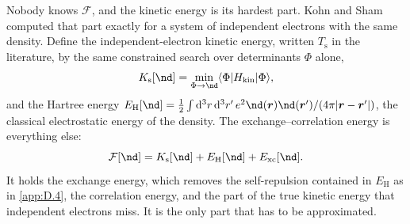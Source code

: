 Nobody knows $\mathcal{F}$, and the kinetic energy is its hardest part. Kohn and Sham computed that part exactly for a system of independent electrons with the same density. Define the independent-electron kinetic energy, written $T_{\mathrm{s}}$ in the literature, by the same constrained search over determinants $\Phi$ alone,
\begin{equation*}
  K_{\mathrm{s}}[\nd] = \min_{\Phi\to\nd}\langle\Phi|H_{\mathrm{kin}}|\Phi\rangle ,
\end{equation*}
and the Hartree energy $E_{\mathrm{H}}[\nd] = \tfrac12\int\dd^3r\,\dd^3r'\,e^2\nd(\vect{r})\nd(\vect{r}')/(4\pi|\vect{r} - \vect{r}'|)$, the classical electrostatic energy of the density. The exchange--correlation energy is everything else:
\begin{equation}
  \mathcal{F}[\nd] = K_{\mathrm{s}}[\nd] + E_{\mathrm{H}}[\nd] + E_{\mathrm{xc}}[\nd] .
  \label{eq:D.5-Exc}
\end{equation}
It holds the exchange energy, which removes the self-repulsion contained in $E_{\mathrm{H}}$ as in \cref{app:D.4}, the correlation energy, and the part of the true kinetic energy that independent electrons miss. It is the only part that has to be approximated.

